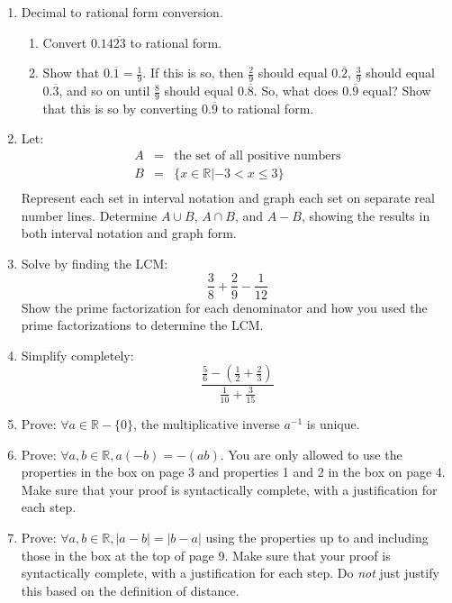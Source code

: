 \documentclass[letterpaper,12pt,fleqn]{article}
\begin{document}
\begin{enumerate}
\item Decimal to rational form conversion.
\begin{enumerate}
\item Convert $0.14\overline{23}$ to rational form.

\item Show that $0.\overline{1} = \frac{1}{9}$. If this is so, then
$\frac{2}{9}$ should equal $0.\overline{2}$,
$\frac{3}{9}$ should equal $0.\overline{3}$,
and so on until $\frac{8}{9}$ should equal $0.\overline{8}$. So, what does
$0.\overline{9}$ equal? Show that this is so by converting
$0.\overline{9}$ to rational form.
\end{enumerate}

\item Let:
\begin{eqnarray*}
A &=& \mbox{the set of all positive numbers} \\
B &=& \{x\in\mathbb{R}|-3<x\le3\} \\
\end{eqnarray*}
Represent each set in interval notation and graph each set on separate real
number lines.  Determine $A\cup B$, $A\cap B$, and $A-B$, showing the results
in both interval notation and graph form.

\item Solve by finding the LCM:
\[\frac{3}{8}+\frac{2}{9}-\frac{1}{12}\]
Show the prime factorization for each denominator and how you used the prime
factorizations to determine the LCM.

\item Simplify completely:
\[\frac{\frac{5}{6}-\left(\frac{1}{2}+\frac{2}{3}\right)}
       {\frac{1}{10}+\frac{3}{15}}\]

\item Prove: $\forall a\in\mathbb{R}-\{0\}$, the multiplicative inverse
$a^{-1}$ is unique.

\item Prove: $\forall a,b\in\mathbb{R}, a(-b)=-(ab)$. You are only allowed to
use the properties in the box on page 3 and properties 1 and 2 in the box on
page 4. Make sure that your proof is syntactically complete, with a
justification for each step.

\item Prove: $\forall a,b\in\mathbb{R}, |a-b|=|b-a|$ using the properties up to
and including those in the box at the top of page 9. Make sure that your proof
is syntactically complete, with a justification for each step. Do \emph{not}
just justify this based on the definition of distance.

\end{enumerate}
\end{document}
